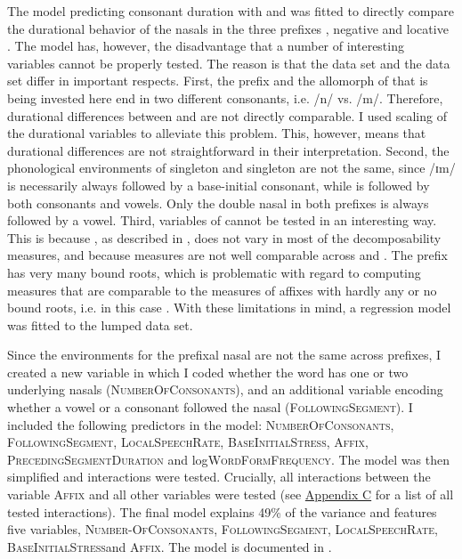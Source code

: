 The model predicting consonant duration with  and  was fitted to directly compare the durational behavior of the nasals in the three prefixes , negative  and locative . The model has, however, the disadvantage that a number of interesting variables cannot be properly tested. The reason is that the  data set and the data set differ in important respects.
First, the prefix  and the allomorph of  that is being invested here end in two different consonants, i.e.  /n/ vs. /m/. Therefore, durational differences between  and  are not directly comparable. I  used scaling of the durational variables to alleviate this problem. This, however, means that durational differences are not straightforward in their interpretation. 
Second, the phonological environments of singleton  and singleton  are not the same, since /ɪm/ is necessarily always followed by a base-initial consonant, while  is followed by both consonants and vowels. Only the double nasal in both prefixes is always followed by a vowel.
Third, variables of   cannot be tested in an interesting way. This is because , as described in , does not vary in most of the decomposability measures, and because  measures are not well comparable across  and . The prefix  has very many bound roots, which is problematic with regard to computing  measures that are comparable to the  measures of affixes with hardly any or no bound roots, i.e. in this case . 
With these limitations in mind, a regression model was fitted to the lumped data set.  

Since the environments for the prefixal nasal are not the same across prefixes, I created a new variable in which I coded whether the word has one or two underlying nasals (\textsc{NumberOfConsonants}), and an additional variable encoding whether a vowel or a consonant followed the nasal (\textsc{FollowingSegment}). I included the following predictors in the model: \textsc{NumberOfConsonants}, \textsc{FollowingSegment}, \textsc{LocalSpeechRate},  \textsc{BaseInitialStress}, \textsc{Affix}, \textsc{PrecedingSegmentDuration} and log\textsc{WordFormFrequency}.
The model was then simplified and interactions were tested. Crucially, all interactions between the variable \textsc{Affix} and all other variables were tested (see \hyperref[Appendix C: Summaries of tested interactions in corpus study]{Appendix C} for a list of all tested interactions). 
The final model explains 49\% of the variance and features five variables, \textsc{Number-OfConsonants}, \textsc{FollowingSegment}, \textsc{LocalSpeechRate}, \textsc{BaseInitialStress}\linebreak and \textsc{Affix}. The model is documented in .




